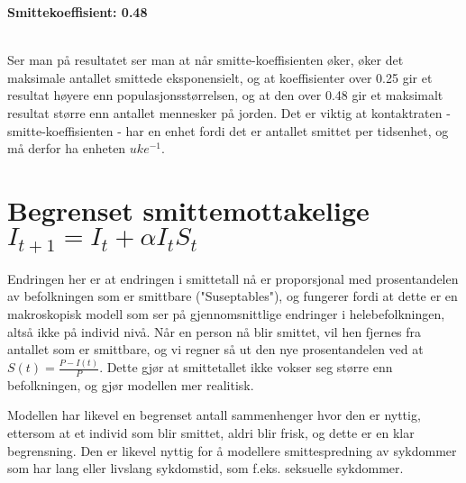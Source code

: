 \documentclass[12pt]{article}
\begin{document}
\newpage
\begin{center}
    \large{\textbf{Smittekoeffisient: 0.48}}\\
    \hphantom{---------}\\
    \hphantom{---------}
\end{center}

Ser man på resultatet ser man at når smitte-koeffisienten øker, øker det maksimale antallet smittede eksponensielt,
og at koeffisienter over 0.25 gir et resultat høyere enn populasjonsstørrelsen, og at den over 0.48 gir et maksimalt 
resultat større enn antallet mennesker på jorden. Det er viktig at kontaktraten - smitte-koeffisienten - har en enhet 
fordi det er antallet smittet per tidsenhet, og må derfor ha enheten $uke^{-1}$.

\newpage
\section{Begrenset smittemottakelige $I_{t+1} = I_t + \alpha I_t S_t$}
Endringen her er at endringen i smittetall nå er proporsjonal med prosentandelen av befolkningen som er smittbare ("Suseptables"), 
og fungerer fordi at dette er en makroskopisk modell som ser på gjennomsnittlige endringer i helebefolkningen, altså ikke på 
individ nivå. Når en person nå blir smittet, vil hen fjernes fra antallet som er smittbare, og vi regner så ut den nye prosentandelen
ved at $S(t) = \frac{P - I(t)}{P}$. Dette gjør at smittetallet ikke vokser seg større enn befolkningen, og gjør modellen mer realitisk.

Modellen har likevel en begrenset antall sammenhenger hvor den er nyttig, ettersom at et individ som blir smittet, aldri blir frisk, og 
dette er en klar begrensning. Den er likevel nyttig for å modellere smittespredning av sykdommer som har lang eller 
livslang sykdomstid, som f.eks. seksuelle sykdommer. 
\end{document}
